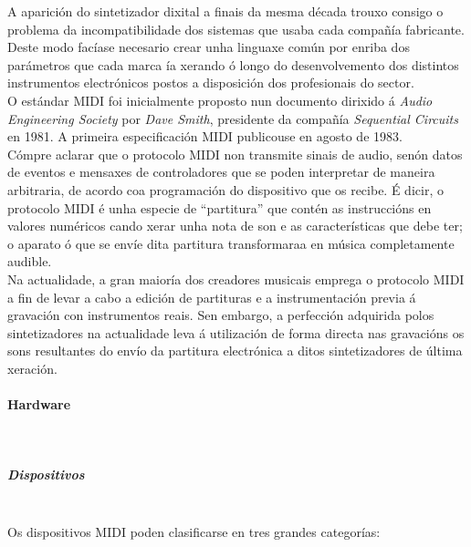    A aparición do sintetizador dixital a finais da mesma década trouxo consigo
   o problema da incompatibilidade dos sistemas que usaba cada compañía
   fabricante. Deste modo facíase necesario crear unha linguaxe común por
   enriba dos parámetros que cada marca ía xerando ó longo do desenvolvemento
   dos distintos instrumentos electrónicos postos a disposición dos
   profesionais do sector. \\

   O estándar MIDI foi inicialmente proposto nun documento dirixido á
   \textit{Audio Engineering Society} por \textit{Dave Smith}, presidente da
   compañía \textit{Sequential Circuits} en 1981. A primeira especificación
   MIDI publicouse en agosto de 1983. \\

   Cómpre aclarar que o protocolo MIDI non transmite sinais de audio, senón
   datos de eventos e mensaxes de controladores que se poden interpretar de
   maneira arbitraria, de acordo coa programación do dispositivo que os recibe.
   É dicir, o protocolo MIDI é unha especie de ``partitura'' que contén as
   instruccións en valores numéricos cando xerar unha nota de son e as
   características que debe ter; o aparato ó que se envíe dita partitura
   transformaraa en música completamente audible. \\

   Na actualidade, a gran maioría dos creadores musicais emprega o protocolo
   MIDI a fin de levar a cabo a edición de partituras e a instrumentación
   previa á gravación con instrumentos reais. Sen embargo, a perfección
   adquirida polos sintetizadores na actualidade leva á utilización de forma
   directa nas gravacións os sons resultantes do envío da partitura electrónica
   a ditos sintetizadores de última xeración.

   \paragraph{Hardware}\mbox{}\\

    \subparagraph{Dispositivos}\mbox{}\\

    Os dispositivos MIDI poden clasificarse en tres grandes categorías:

